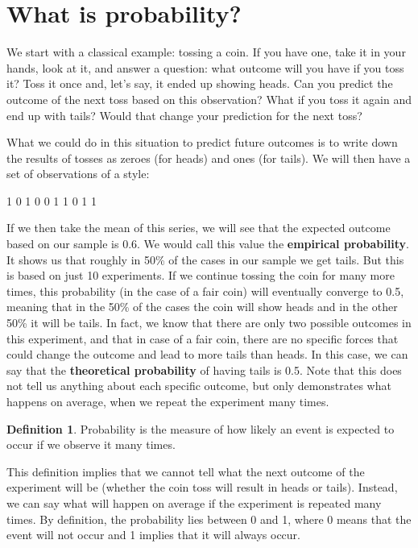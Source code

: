 \documentclass[
]{book}
\theoremstyle{definition}
\newtheorem{definition}{Definition}[chapter]
\theoremstyle{definition}
\theoremstyle{definition}
\theoremstyle{definition}
\theoremstyle{remark}
\begin{document}
\section{What is probability?}\label{whatIsProbability}

We start with a classical example: tossing a coin. If you have one, take it in your hands, look at it, and answer a question: what outcome will you have if you toss it? Toss it once and, let's say, it ended up showing heads. Can you predict the outcome of the next toss based on this observation? What if you toss it again and end up with tails? Would that change your prediction for the next toss?

What we could do in this situation to predict future outcomes is to write down the results of tosses as zeroes (for heads) and ones (for tails). We will then have a set of observations of a style:

1 0 1 0 0 1 1 0 1 1

If we then take the mean of this series, we will see that the expected outcome based on our sample is 0.6. We would call this value the \textbf{empirical probability}. It shows us that roughly in 50\% of the cases in our sample we get tails. But this is based on just 10 experiments. If we continue tossing the coin for many more times, this probability (in the case of a fair coin) will eventually converge to 0.5, meaning that in the 50\% of the cases the coin will show heads and in the other 50\% it will be tails. In fact, we know that there are only two possible outcomes in this experiment, and that in case of a fair coin, there are no specific forces that could change the outcome and lead to more tails than heads. In this case, we can say that the \textbf{theoretical probability} of having tails is 0.5. Note that this does not tell us anything about each specific outcome, but only demonstrates what happens on average, when we repeat the experiment many times.

\begin{definition}
Probability is the measure of how likely an event is expected to occur if we observe it many times.
\end{definition}

This definition implies that we cannot tell what the next outcome of the experiment will be (whether the coin toss will result in heads or tails). Instead, we can say what will happen on average if the experiment is repeated many times. By definition, the probability lies between 0 and 1, where 0 means that the event will not occur and 1 implies that it will always occur.
\end{document}

